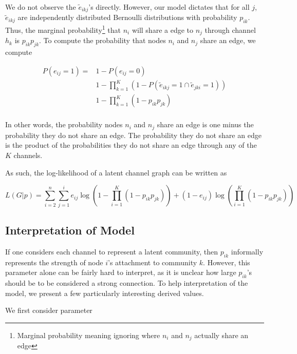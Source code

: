 \documentclass[11pt]{amsart}
\newcommand{\latentedge}{\tilde e}
\begin{document}
We do not observe the $\latentedge_{ikj}$'s directly. 
However, our model dictates that for all $j$, $\latentedge_{ikj}$ are independently distributed Bernoulli 
distributions with probability $p_{ik}$. 
Thus, the marginal probability\footnote{Marginal probability meaning ignoring where $n_i$ and $n_j$ actually share an edge} 
that $n_i$ will share a edge to $n_j$ through channel $h_k$ is $p_{ik} p_{jk}$. 
To compute the probability that nodes $n_i$ and $n_j$ share an edge, we compute

\begin{equation} \label{eq:edgeProb}
\begin{split}
P(e_{ij} = 1) =   &1 - P(e_{ij} = 0) \\
			& 1 - \prod_{k = 1}^K \left(1 - P(\latentedge_{ikj} = 1 \cap \latentedge_{jki} = 1) \right) \\
                         & 1 - \prod_{k = 1}^K (1 - p_{ik} p_{jk}) \\
\end{split}
\end{equation}


In other words, the probability nodes $n_i$ and $n_j$ share an edge
is one minus the probability they do not share an edge. The probability they do not share
an edge is  the product of the probabilities they do not share an edge through any of the $K$ channels. 

As such, the log-likelihood of a latent channel graph can be written as 

\begin{equation}\label{eq:llk}
L(G | p) = \sum_{i = 2}^n \sum_{j = 1}^i 
    e_{ij} \log \left( 1 - \prod_{i = 1}^K (1 - p_{ik} p_{jk}) \right) + 
    (1 - e_{ij}) \log \left( \prod_{i = 1}^K (1 - p_{ik} p_{jk}) \right)
\end{equation}


\subsection{Interpretation of Model}


If one considers each channel to represent a latent community, then $p_{ik}$ informally represents 
the strength of node $i$'s attachment to community $k$. However, this parameter alone can be fairly hard to interpret, 
as it is unclear how large $p_{ik}$'s should be to be considered a strong connection. 
To help interpretation of the model, we present a few particularly interesting derived values. 

We first consider parameter
\end{document}
